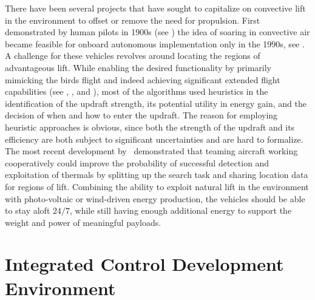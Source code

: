 \documentclass[letterpaper, 10 pt, conference]{ieeeconf}  %
\begin{document}
There have been several projects that have sought to capitalize on convective
lift in the environment to offset or remove the need for propulsion. First
demonstrated by human pilots in 1900s (see \cite{Simons:1998}) the idea of
soaring in convective air became feasible for onboard autonomous
implementation only in the 1990s, see \cite{Wharington:1998}. A challenge for
these vehicles revolves around locating the regions of advantageous lift.
While enabling the desired functionality by primarily mimicking the birds
flight and indeed achieving significant extended flight capabilities (see
\cite{Edwards:2008}, \cite{Allen:2006}, and \cite{Allen:2007}), most of the
algorithms used heuristics in the identification of the updraft strength, its
potential utility in energy gain, and the decision of when and how to enter
the updraft. The reason for employing heuristic approaches is obvious, since
both the strength of the updraft and its efficiency are both subject to
significant uncertainties and are hard to formalize. The most recent
development by~\cite{AKlass_CDC:2012,AKlass_JGCD:2012} demonstrated that
teaming aircraft working cooperatively could improve the probability of
successful detection and exploitation of thermals by splitting up the search
task and sharing location data for regions of lift. Combining the ability to
exploit natural lift in the environment with photo-voltaic or wind-driven
energy production, the vehicles should be able to stay aloft $24/7$, while
still having enough additional energy to support the weight and power of
meaningful payloads.


\section{Integrated Control Development Environment}
\end{document}
